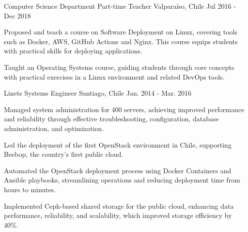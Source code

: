 \begin{cventries}
    \cventry
    {Computer Science Department}
    {Part-time Teacher}
    {Valparaíso, Chile}
    {Jul 2016 - Dec 2018}
    {
      \begin{cvitems}
        \item{Proposed and teach a course on Software Deployment on Linux, covering tools such as Docker, AWS, GitHub Actions and Nginx. This course equips students with practical skills for deploying applications.}
        \item{Taught an Operating Systems course, guiding students through core concepts with practical exercises in a Linux environment and related DevOps tools.}
      \end{cvitems}
    }


  \cventry
    {Linets}
    {Systems Engineer}
    {Santiago, Chile}
    {Jan. 2014 - Mar. 2016}
    {
      \begin{cvitems}
        \item{Managed system administration for 400 servers, achieving improved performance and reliability through effective troubleshooting, configuration, database administration, and optimization.}
        \item{Led the deployment of the first OpenStack environment in Chile, supporting Beebop, the country's first public cloud.}
        \item{Automated the OpenStack deployment process using Docker Containers and Ansible playbooks, streamlining operations and reducing deployment time from hours to minutes.}
        \item{Implemented Ceph-based shared storage for the public cloud, enhancing data performance, reliability, and scalability, which improved storage efficiency by 40\%.}
      \end{cvitems}
    }

\end{cventries}
